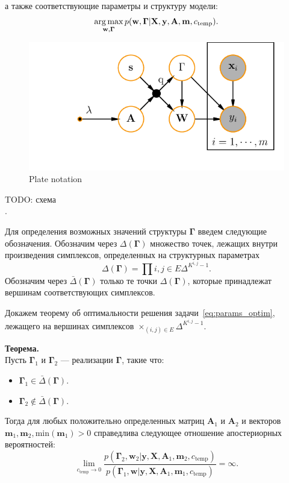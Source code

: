 а также соответствующие параметры и структуру модели:
\begin{equation}
\label{eq:params_optim}
    \operatorname*{arg\,max}_{\mathbf{w}, \boldsymbol{\Gamma}}  p(\mathbf{w}, \boldsymbol{\Gamma}|\mathbf{X},\mathbf{y}, \mathbf{A}, \mathbf{m}, {c_\text{temp}}).
\end{equation}

 \begin{figure}[H]
\includegraphics[width=\textwidth]{./plots/notebooks/plate.pdf}
\caption{Plate notation}
\end{figure}

TODO: схема\\.


Для определения возможных значений структуры $\boldsymbol{\Gamma}$ введем следующие обозначения.
Обозначим через $\Delta(\boldsymbol{\Gamma})$ множество точек, лежащих внутри произведения симплексов, определенных на структурных параметрах
$$
\Delta(\boldsymbol{\Gamma}) =  \prod{i,j \in E}\Delta^{K^{i,j}-1}.
$$
Обозначим через $\bar{\Delta}(\boldsymbol{\Gamma})$ только те точки $\Delta(\boldsymbol{\Gamma})$, которые принадлежат вершинам соответствующих симплексов.


Докажем теорему об оптимальности решения задачи~\eqref{eq:params_optim}, лежащего на вершинах симплексов $\times_{(i,j) \in E} \Delta^{K^{i,j}-1}$. 


\textbf{Теорема.} \\
Пусть $\boldsymbol{\Gamma}_1$ и $\boldsymbol{\Gamma}_2$ --- реализации $\boldsymbol{\Gamma}$, такие что:
\begin{itemize}
\item $\boldsymbol{\Gamma}_1 \in \bar{\Delta}(\boldsymbol{\Gamma})$.
\item $\boldsymbol{\Gamma}_2 \not \in \bar{\Delta}(\boldsymbol{\Gamma})$.
\end{itemize} 
Тогда для любых положительно определенных матриц $\mathbf{A}_1$ и $\mathbf{A}_2$ и векторов $\mathbf{m}_1, \mathbf{m}_2, \text{min}(\mathbf{m}_1)>0$ справедлива следующее отношение апостериорных вероятностей:
$$\lim_{c_\text{temp} \to 0} \frac{p(\boldsymbol{\Gamma}_2, \mathbf{w}_2|\mathbf{y},  \mathbf{X},\mathbf{A}_1,\mathbf{m}_2, {c_\text{temp}})}{p(\boldsymbol{\Gamma}_1,  \mathbf{w}|\mathbf{y}, \mathbf{X},\mathbf{A}_1,\mathbf{m}_1, {c_\text{temp}})} = \infty.$$


